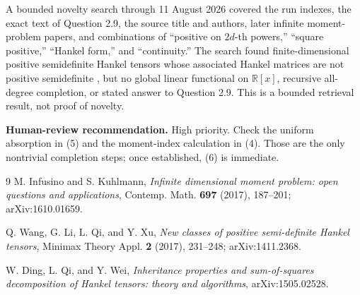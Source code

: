 \documentclass[11pt]{article}
\newcommand{\R}{\mathbb R}
\begin{document}
A bounded novelty search through 11 August 2026 covered the run indexes, the
exact text of Question 2.9, the source title and authors, later infinite
moment-problem papers, and combinations of ``positive on $2d$-th powers,''
``square positive,'' ``Hankel form,'' and ``continuity.''  The search found
finite-dimensional positive semidefinite Hankel tensors whose associated
Hankel matrices are not positive semidefinite \cite{WLQX,DQW}, but no global
linear functional on $\R[x]$, recursive all-degree completion, or stated
answer to Question 2.9.  This is a bounded retrieval result, not proof of
novelty.

\medskip
\noindent\textbf{Human-review recommendation.} High priority.  Check the
uniform absorption in (5) and the moment-index calculation in (4).  Those are
the only nontrivial completion steps; once established, (6) is immediate.

\begin{thebibliography}{9}
M. Infusino and S. Kuhlmann,
\emph{Infinite dimensional moment problem: open questions and applications},
Contemp. Math. \textbf{697} (2017), 187--201; arXiv:1610.01659.

Q. Wang, G. Li, L. Qi, and Y. Xu,
\emph{New classes of positive semi-definite Hankel tensors},
Minimax Theory Appl. \textbf{2} (2017), 231--248; arXiv:1411.2368.

W. Ding, L. Qi, and Y. Wei,
\emph{Inheritance properties and sum-of-squares decomposition of Hankel
tensors: theory and algorithms}, arXiv:1505.02528.
\end{thebibliography}
\end{document}
